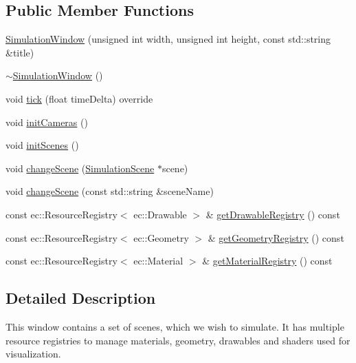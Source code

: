 \subsection*{Public Member Functions}
\begin{DoxyCompactItemize}
\item 
\mbox{\hyperlink{class_simulation_window_af21a1b7626066495d16674dccd8c5fa7}{Simulation\+Window}} (unsigned int width, unsigned int height, const std\+::string \&title)
\item 
\mbox{\hyperlink{class_simulation_window_a1bad20391bd8ee4c2366bd1ac667ecdf}{$\sim$\+Simulation\+Window}} ()
\item 
void \mbox{\hyperlink{class_simulation_window_a7cde85cc846dceb4cbb9913f861b495a}{tick}} (float time\+Delta) override
\item 
void \mbox{\hyperlink{class_simulation_window_a787e405dd71c59fcf2dd58e75d233020}{init\+Cameras}} ()
\item 
void \mbox{\hyperlink{class_simulation_window_a60ebe43a626ec7acebadc93d37de8b70}{init\+Scenes}} ()
\item 
void \mbox{\hyperlink{class_simulation_window_a3f08510bb143568c18c20bd7528cb6a4}{change\+Scene}} (\mbox{\hyperlink{class_simulation_scene}{Simulation\+Scene}} $\ast$scene)
\item 
void \mbox{\hyperlink{class_simulation_window_a49e6df3f3396dbbe16dbc64c1ed7b315}{change\+Scene}} (const std\+::string \&scene\+Name)
\item 
const ec\+::\+Resource\+Registry$<$ ec\+::\+Drawable $>$ \& \mbox{\hyperlink{class_simulation_window_ae04cef316702d65cf4d6e119fa4c6cae}{get\+Drawable\+Registry}} () const
\item 
const ec\+::\+Resource\+Registry$<$ ec\+::\+Geometry $>$ \& \mbox{\hyperlink{class_simulation_window_aee0f598e5e41c2c4d8142075a294c13a}{get\+Geometry\+Registry}} () const
\item 
const ec\+::\+Resource\+Registry$<$ ec\+::\+Material $>$ \& \mbox{\hyperlink{class_simulation_window_a0be5e363792b95388f1dfae85560c5f7}{get\+Material\+Registry}} () const
\end{DoxyCompactItemize}


\subsection{Detailed Description}
This window contains a set of scenes, which we wish to simulate. It has multiple resource registries to manage materials, geometry, drawables and shaders used for visualization. 

